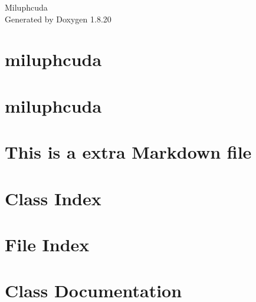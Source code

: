 \let\mypdfximage\pdfximage\def\pdfximage{\immediate\mypdfximage}\documentclass[twoside]{book}
\newcommand{\+}{\discretionary{\mbox{\scriptsize$\hookleftarrow$}}{}{}}
\newcommand{\clearemptydoublepage}{%
  \newpage{\pagestyle{empty}\cleardoublepage}%
}
\begin{document}
\hypersetup{pageanchor=false,
             bookmarksnumbered=true,
             pdfencoding=unicode
            }
\begin{titlepage}
\vspace*{7cm}
\begin{center}%
{\Large Miluphcuda }\\
\vspace*{1cm}
{\large Generated by Doxygen 1.8.20}\\
\end{center}
\end{titlepage}
\clearemptydoublepage
{}
\tableofcontents
\clearemptydoublepage
{}
\hypersetup{pageanchor=true}

\chapter{miluphcuda}
\label{index}\hypertarget{index}{}
\chapter{miluphcuda}
\label{md__r_e_a_d_m_e}

\chapter{This is a extra Markdown file}
\label{md_doc__extra_markdown}

\chapter{Class Index}

\chapter{File Index}

\chapter{Class Documentation}




\end{document}
